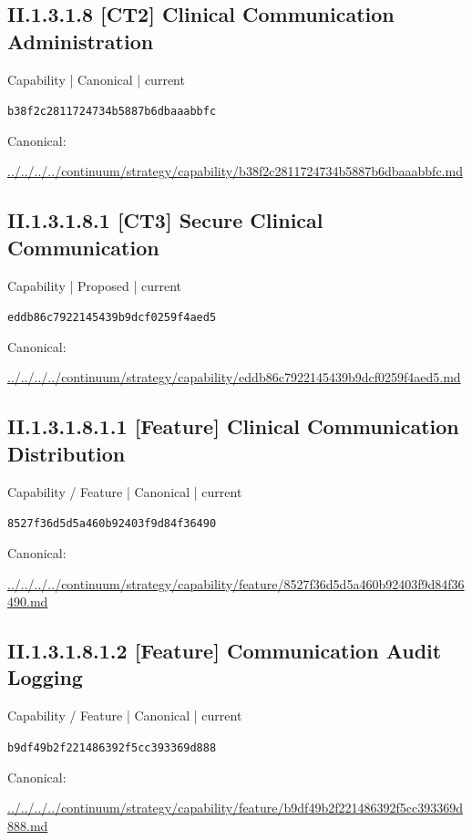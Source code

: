 \documentclass[10pt,a4paper]{article}
\begin{document}
\subsection*{II.1.3.1.8 [CT2] Clinical Communication Administration}
{\small Capability | Canonical | current}\par
\texttt{b38f2c2811724734b5887b6dbaaabbfc}\par
Canonical: \par
{\footnotesize\url{../../../../continuum/strategy/capability/b38f2c2811724734b5887b6dbaaabbfc.md}}\par
\subsection*{II.1.3.1.8.1 [CT3] Secure Clinical Communication}
{\small Capability | Proposed | current}\par
\texttt{eddb86c7922145439b9dcf0259f4aed5}\par
Canonical: \par
{\footnotesize\url{../../../../continuum/strategy/capability/eddb86c7922145439b9dcf0259f4aed5.md}}\par
\subsection*{II.1.3.1.8.1.1 [Feature] Clinical Communication Distribution}
{\small Capability / Feature | Canonical | current}\par
\texttt{8527f36d5d5a460b92403f9d84f36490}\par
Canonical: \par
{\footnotesize\url{../../../../continuum/strategy/capability/feature/8527f36d5d5a460b92403f9d84f36490.md}}\par
\subsection*{II.1.3.1.8.1.2 [Feature] Communication Audit Logging}
{\small Capability / Feature | Canonical | current}\par
\texttt{b9df49b2f221486392f5cc393369d888}\par
Canonical: \par
{\footnotesize\url{../../../../continuum/strategy/capability/feature/b9df49b2f221486392f5cc393369d888.md}}\par
\end{document}
